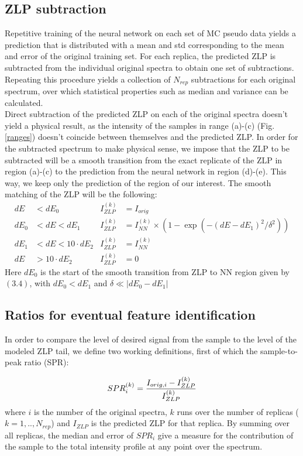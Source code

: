 \documentclass[11pt,a4paper]{article}
\def\frac#1#2{{{#1}\over {#2}}}
\numberwithin{equation}{section}
\numberwithin{figure}{section}
\numberwithin{table}{section}
\begin{document}
\subsection{ZLP subtraction}
Repetitive training of the neural network on each set of MC pseudo data yields a prediction that is distributed with a mean and std corresponding to the mean and error of the original training set. For each replica, the predicted ZLP is subtracted from the individual original spectra to obtain one set of subtractions. Repeating this procedure yields a collection of $N_{rep}$ subtractions for each original spectrum, over which statistical properties such as median and variance can be calculated. \\

Direct subtraction of the predicted ZLP on each of the original spectra doesn't yield a physical result, as the intensity of the samples in range (a)-(c) (Fig. \ref{ranges}) doesn't coincide between themselves and the predicted ZLP. In order for the subtracted spectrum to make physical sense, we impose that the ZLP to be subtracted will be a smooth transition from the exact replicate of the ZLP in region (a)-(c) to the prediction from the neural network in region (d)-(e). This way, we keep only the prediction of the region of our interest. The smooth matching of the ZLP will be the following:
\begin{align}
 dE &< dE_0          &   I_{ZLP}^{(k)} &= I_{orig}\\
 dE_0 &< dE < dE_1   &  I_{ZLP}^{(k)} &= I_{NN}^{(k)} \times  \left( 1 - \exp(-(dE - dE_1)^2/\delta^2)\right) \\
 dE_1 &< dE < 10 \cdot dE_2 &  I_{ZLP}^{(k)} &= I_{NN}^{(k)}\\
 dE &> 10 \cdot dE_2 &   I_{ZLP}^{(k)} &= 0
\end{align}
Here $dE_0$ is the start of the smooth transition from ZLP to NN region given by $(3.4)$, with $dE_0<dE_1$  and $\delta \ll |dE_0 - dE_1|$


\subsection{Ratios for eventual feature identification}

In order to compare the level of desired signal from the sample to the level of the modeled ZLP tail, we define two working definitions, first of which the sample-to-peak ratio (SPR):

\begin{equation}
    SPR_{i}^{(k)} = \frac{I_{orig, i} - I_{ZLP}^{(k)}}{I_{ZLP}^{(k)}}
\end{equation}
where $i$ is the number of the original spectra, $k$ runs over the number of replicas ($k=1,..,N_{rep}$) and $I_{ZLP}$ is the predicted ZLP for that replica. By summing over all replicas, the median and error of $SPR_i$ give a measure for the contribution of the sample to the total intensity profile at any point over the spectrum. \\
\end{document}
